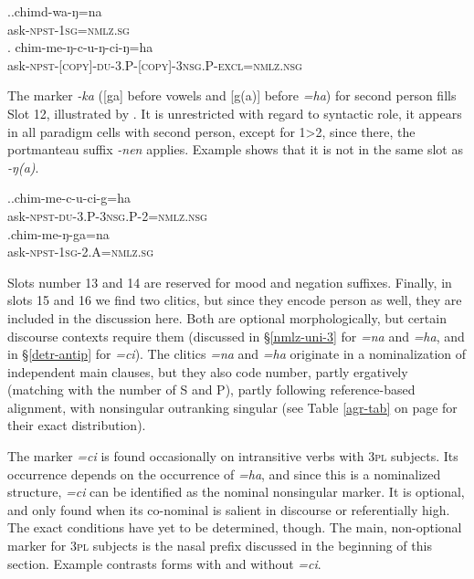 	\ex.\ag.chimd-wa-ŋ=na\\
	ask{\scshape -npst-1sg=nmlz.sg}\\
	\bg. chim-me-ŋ-c-u-ŋ-ci-ŋ=ha\\
	ask{\scshape -npst-[copy]-du-3.P-[copy]-3nsg.P-excl=nmlz.nsg}\\
		
		
The marker \emph{-ka} ([ga] before vowels and [g(a)] before \emph{=ha}) for second person  fills Slot 12, illustrated by  \Next. It is unrestricted with regard to syntactic role, it appears in all paradigm cells with second person, except for 1>2, since there, the portmanteau suffix \emph{-nen} applies. Example \Next[b] shows that it is not in the same slot as \emph{-ŋ(a)}.

\ex.\ag.chim-me-c-u-ci-g=ha\\
	ask{\scshape -npst-du-3.P-3nsg.P-2=nmlz.nsg}\\
	\bg.chim-me-ŋ-ga=na\\
	ask{\scshape -npst-1sg-2.A=nmlz.sg}\\
	
	
Slots number 13 and 14 are reserved for mood and negation suffixes. Finally, in slots 15 and 16 we find two clitics, but since they encode person as well, they are included in the discussion here. Both are optional morphologically, but certain discourse contexts require them (discussed in §\ref{nmlz-uni-3} for \emph{=na} and \emph{=ha}, and in §\ref{detr-antip} for \emph{=ci}). The clitics \emph{=na} and \emph{=ha} originate in a nominalization of independent main clauses, but they also code number, partly ergatively (matching with the number of S and P), partly following reference-based alignment, with nonsingular outranking singular (see Table \ref{agr-tab} on page \pageref{agr-tab} for their exact distribution).

The marker \emph{=ci} is found occasionally on intransitive verbs with {\scshape 3pl} subjects. Its occurrence depends on the occurrence of \emph{=ha}, and since this is a nominalized structure, \emph{=ci} can be identified as the nominal nonsingular marker.  It is optional, and only found when its co-nominal is salient in discourse or referentially high. The exact conditions have yet to be determined, though. The main, non-optional marker for {\scshape 3pl} subjects is the nasal prefix discussed in the beginning of this section. Example \Next contrasts forms with and without \emph{=ci}. 

